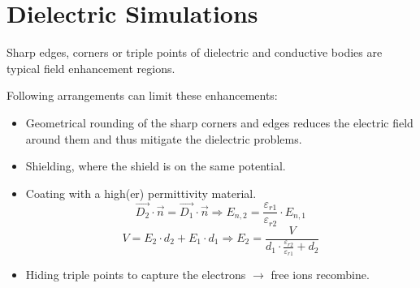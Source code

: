 \section{Dielectric Simulations}

Sharp edges, corners or triple points of dielectric and conductive bodies are typical field enhancement regions. \newline
\begin{minipage}[lt]{15cm}
	Following arrangements can limit these enhancements:
	\begin{itemize}
		\item Geometrical rounding of the sharp corners and edges reduces the electric field around them and thus mitigate the dielectric problems.
		\item Shielding, where the shield is on the same potential.
		\item Coating with a high(er) permittivity material. 
		\begin{equation*}
			\vec{D_2}\cdot \vec{n} = \vec{D_1}\cdot \vec{n} \Rightarrow E_{n,\textrm{2}} = \frac{\varepsilon_{r1}}{\varepsilon_{r2}} \cdot E_{n,\textrm{1}}
		\end{equation*}
		\begin{equation*}
			V = E_2 \cdot d_2 + E_1 \cdot d_1 \Rightarrow E_2 = \frac{V}{d_1\cdot \frac{\varepsilon_{r2}}{\varepsilon_{r1}}+d_2}
		\end{equation*}
		\item Hiding triple points to capture the electrons $\rightarrow$ free ions recombine.
	\end{itemize}
\end{minipage}
